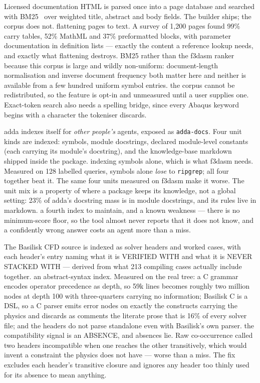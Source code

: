 {Licensed documentation HTML is parsed once into a page database and searched
with BM25~\cite{robertson2009bm25} over weighted title, abstract and body
fields. The builder ships; the corpus does not.}
{flattening pages to text. A survey of 1{,}200 pages found 99\% carry tables,
52\% MathML and 37\% preformatted blocks, with parameter documentation in
definition lists --- exactly the content a reference lookup needs, and exactly
what flattening destroys. BM25 rather than the f3dasm ranker because this
corpus is large and wildly non-uniform: document-length normalisation and
inverse document frequency both matter here and neither is available from a
few hundred uniform symbol entries.}
{the corpus cannot be redistributed, so the feature is opt-in and unmeasured
until a user supplies one. Exact-token search also needs a spelling bridge,
since every Abaqus keyword begins with a character the tokeniser discards.}

{adda indexes itself for \emph{other people's} agents, exposed as
\texttt{adda-docs}. Four unit kinds are indexed: symbols, module docstrings,
declared module-level constants (each carrying its module's docstring), and the
knowledge-base markdown shipped inside the package.}
{indexing symbols alone, which is what f3dasm needs. Measured on 128 labelled
queries, symbols alone \emph{lose} to \texttt{ripgrep}; all four together beat
it. The same four units measured on f3dasm make it worse. The unit mix is a
property of where a package keeps its knowledge, not a global setting: 23\% of
adda's docstring mass is in module docstrings, and its rules live in markdown.}
{a fourth index to maintain, and a known weakness --- there is no minimum-score
floor, so the tool almost never reports that it does not know, and a
confidently wrong answer costs an agent more than a miss.}

{The Basilisk CFD source is indexed as solver headers and worked cases, with
each header's entry naming what it is VERIFIED WITH and what it is NEVER
STACKED WITH --- derived from what 213 compiling cases actually include
together.}
{an abstract-syntax index. Measured on the real tree: a C grammar encodes
operator precedence as depth, so 59k lines becomes roughly two million nodes at
depth 100 with three-quarters carrying no information; Basilisk C is a DSL, so
a C parser emits error nodes on exactly the constructs carrying the physics and
discards as comments the literate prose that is 16\% of every solver file; and
the headers do not parse standalone even with Basilisk's own parser.}
{the compatibility signal is an ABSENCE, and absences lie. Raw co-occurrence
called two headers incompatible when one reaches the other transitively, which
would invent a constraint the physics does not have --- worse than a miss. The
fix excludes each header's transitive closure and ignores any header too thinly
used for its absence to mean anything.}

